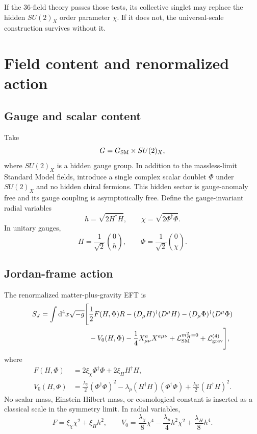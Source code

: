 \documentclass[11pt,a4paper]{article}
\newcommand{\dd}{\mathrm{d}}
\newcommand{\Lag}{\mathcal{L}}
\begin{document}
If the 36-field theory passes those tests, its collective singlet may replace the hidden $SU(2)_X$ order parameter $\chi$. If it does not, the universal-scale construction survives without it.

\section{Field content and renormalized action}

\subsection{Gauge and scalar content}

Take
\[
G=G_{\rm SM}\times SU(2)_X,
\]
where $SU(2)_X$ is a hidden gauge group. In addition to the massless-limit Standard Model fields, introduce a single complex scalar doublet $\Phi$ under $SU(2)_X$ and no hidden chiral fermions. This hidden sector is gauge-anomaly free and its gauge coupling is asymptotically free. Define the gauge-invariant radial variables
\[
 h=\sqrt{2H^\dagger H},\qquad
 \chi=\sqrt{2\Phi^\dagger\Phi}.
\]
In unitary gauges,
\[
 H=\frac{1}{\sqrt2}\binom{0}{h},\qquad
 \Phi=\frac{1}{\sqrt2}\binom{0}{\chi}.
\]

\subsection{Jordan-frame action}

The renormalized matter-plus-gravity EFT is
\begin{align}
S_J=\int \dd^4x\sqrt{-g}\Bigg[&
\frac12F(H,\Phi)R
-(D_\mu H)^\dagger(D^\mu H)
-(D_\mu\Phi)^\dagger(D^\mu\Phi)
\nonumber\\
&-V_0(H,\Phi)
-\frac14X^a_{\mu\nu}X^{a\mu\nu}
+\Lag_{\rm SM}^{m_H^2=0}
+\Lag_{\rm grav}^{(4)}
\Bigg],
\label{eq:action}
\end{align}
where
\begin{align}
F(H,\Phi)&=2\xi_\chi\Phi^\dagger\Phi+2\xi_HH^\dagger H,
\label{eq:F}\\
V_0(H,\Phi)&=
\frac{\lambda_\chi}{2}(\Phi^\dagger\Phi)^2
-\lambda_p(H^\dagger H)(\Phi^\dagger\Phi)
+\frac{\lambda_H}{2}(H^\dagger H)^2.
\label{eq:potential}
\end{align}
No scalar mass, Einstein-Hilbert mass, or cosmological constant is inserted as a classical scale in the symmetry limit. In radial variables,
\[
F=\xi_\chi\chi^2+\xi_Hh^2,
\qquad
V_0=\frac{\lambda_\chi}{8}\chi^4
-\frac{\lambda_p}{4}h^2\chi^2
+\frac{\lambda_H}{8}h^4.
\]
\end{document}
